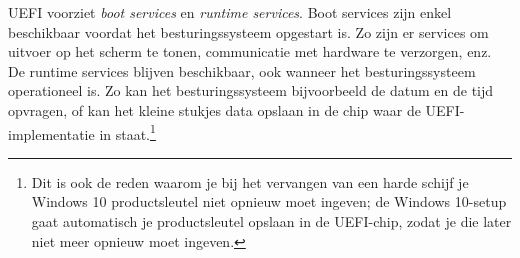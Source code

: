 UEFI voorziet \emph{boot services} en \emph{runtime services}. Boot services zijn enkel beschikbaar voordat het besturingssysteem opgestart is. Zo zijn er services om uitvoer op het scherm te tonen, communicatie met hardware te verzorgen, enz. De runtime services blijven beschikbaar, ook wanneer het besturingssysteem operationeel is. Zo kan het besturingssysteem bijvoorbeeld de datum en de tijd opvragen, of kan het kleine stukjes data opslaan in de chip waar de UEFI-implementatie in staat.\footnote{Dit is ook de reden waarom je bij het vervangen van een harde schijf je Windows 10 productsleutel niet opnieuw moet ingeven; de Windows 10-setup gaat automatisch je productsleutel opslaan in de UEFI-chip, zodat je die later niet meer opnieuw moet ingeven.}





